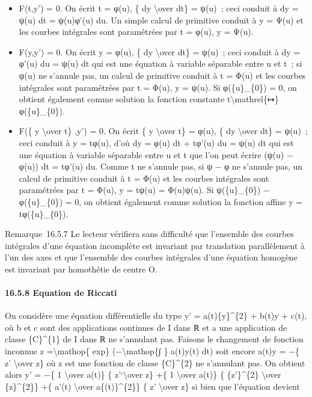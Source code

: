 \documentclass[]{article}
\begin{document}
\begin{itemize}
\itemsep1pt\parskip0pt
\item
  F(t,y') = 0. On écrit t = φ(u), \{ dy \textbackslash{}over dt\} =
  ψ(u)~; ceci conduit à dy = ψ(u) dt = ψ(u)φ'(u) du. Un simple calcul de
  primitive conduit à y = Ψ(u) et les courbes intégrales sont
  paramétrées par t = φ(u), y = Ψ(u).
\item
  F(y,y') = 0. On écrit y = φ(u), \{ dy \textbackslash{}over dt\} =
  ψ(u)~; ceci conduit à dy = φ'(u) du = ψ(u) dt qui est une équation à
  variable séparable entre u et t~; si ψ(u) ne s'annule pas, un calcul
  de primitive conduit à t = Φ(u) et les courbes intégrales sont
  paramétrées par t = Φ(u), y = ψ(u). Si φ(\{u\}\_\{0\}) = 0, on obtient
  également comme solution la fonction constante
  t\textbackslash{}mathrel\{↦\}φ(\{u\}\_\{0\}).
\item
  F(\{ y \textbackslash{}over t\} ,y') = 0. On écrit \{ y
  \textbackslash{}over t\} = φ(u), \{ dy \textbackslash{}over dt\} =
  ψ(u)~; ceci conduit à y = tφ(u), d'où dy = φ(u) dt + tφ'(u) du = ψ(u)
  dt qui est une équation à variable séparable entre u et t que l'on
  peut écrire (ψ(u) − φ(u)) dt = tφ'(u) du. Comme t ne s'annule pas, si
  ψ − φ ne s'annule pas, un calcul de primitive conduit à t = Φ(u) et
  les courbes intégrales sont paramétrées par t = Φ(u), y = tψ(u) =
  Φ(u)ψ(u). Si ψ(\{u\}\_\{0\}) − φ(\{u\}\_\{0\}) = 0, on obtient
  également comme solution la fonction affine y = tφ(\{u\}\_\{0\}).
\end{itemize}

Remarque~16.5.7 Le lecteur vérifiera sans difficulté que l'ensemble des
courbes intégrales d'une équation incomplète est invariant par
translation parallèlement à l'un des axes et que l'ensemble des courbes
intégrales d'une équation homogène est invariant par homothétie de
centre O.

\paragraph{16.5.8 Equation de Riccati}

On considère une équation différentielle du type y' = a(t)\{y\}\^{}\{2\}
+ b(t)y + c(t), où b et c sont des applications continues de I dans ℝ et
a une application de classe \{C\}\^{}\{1\} de I dans ℝ ne s'annulant
pas. Faisons le changement de fonction inconnue z
=\textbackslash{}mathop\{ exp\} (−\textbackslash{}mathop\{∫ \} a(t)y(t)
dt) soit encore a(t)y = −\{ z' \textbackslash{}over z\} où z est une
fonction de classe \{C\}\^{}\{2\} ne s'annulant pas. On obtient alors y'
= −\{ 1 \textbackslash{}over a(t)\} \{ z'`\textbackslash{}over z\} +\{ 1
\textbackslash{}over a(t)\} \{ \{z'\}\^{}\{2\} \textbackslash{}over
\{z\}\^{}\{2\}\} +\{ a'(t) \textbackslash{}over a\{(t)\}\^{}\{2\}\} \{
z' \textbackslash{}over z\} si bien que l'équation devient
\end{document}
